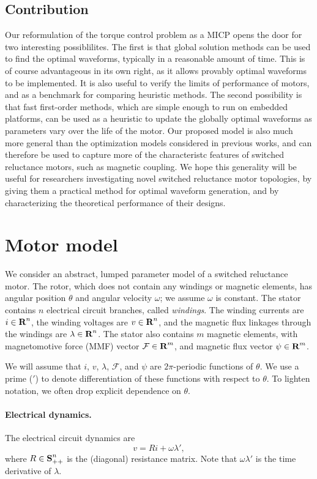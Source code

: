 \documentclass[11pt]{article}
\newcommand{\reals}{{\mbox{\bf R}}}
\newcommand{\symm}{{\mbox{\bf S}}}
\begin{document}
\subsection{Contribution}
Our reformulation of the torque control problem as a MICP opens the door for two
interesting possiblilites.
The first is that global solution methods can be used to find the optimal waveforms,
typically in a reasonable amount of time.
This is of course advantageous in its own right,
as it allows provably optimal waveforms to be implemented.
It is also useful to verify the limits of performance of motors,
and as a benchmark for comparing heuristic methods.
The second possibility is that fast first-order methods, 
which are simple enough to run on embedded platforms,
can be used as a heuristic to update the globally optimal waveforms as 
parameters vary over the life of the motor.
Our proposed model is also much more general than
the optimization models considered in previous works,
and can therefore be used to capture more of the characteristc features of
switched reluctance motors, such as magnetic coupling.
We hope this generality will be useful for researchers investigating
novel switched reluctance motor topologies,
by giving them a practical method for optimal waveform generation,
and by characterizing the theoretical performance of their designs.

\section{Motor model}
\label{s-model}
We consider an abstract, lumped parameter model of a switched reluctance motor.
The rotor, which does not contain any windings or magnetic elements,
has angular position $\theta$ and angular velocity $\omega$;
we assume $\omega$ is constant. 
The stator contains $n$ electrical circuit branches, called {\it windings}.
The winding currents are $i \in \reals^n$,
the winding voltages are $v \in \reals^n$,
and the magnetic flux linkages through the windings are $\lambda \in \reals^n$.
The stator also contains $m$ magnetic elements,
with magnetomotive force (MMF) vector $\mathcal F \in \reals^m$,
and magnetic flux vector $\psi \in \reals^m$.

We will assume that 
$i$, $v$, $\lambda$, $\mathcal F$, and $\psi$
are $2\pi$-periodic functions of $\theta$.
We use a prime ($'$) to denote differentiation of these functions with respect
to $\theta$. 
To lighten notation, we often drop explicit dependence on $\theta$.


\paragraph{Electrical dynamics.}
The electrical circuit dynamics are
\begin{equation}
\label{e-dynamics}
v = Ri + \omega \lambda',
\end{equation}
where $R\in\symm_{++}^n$ is the (diagonal) resistance matrix.
Note that $\omega\lambda'$ is the time derivative of $\lambda$.
\end{document}
